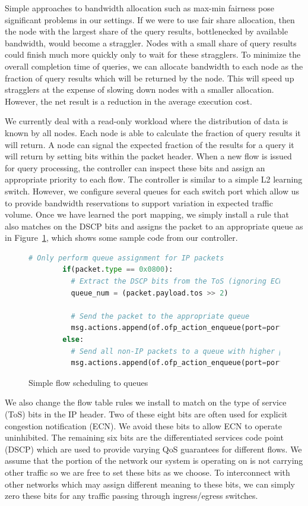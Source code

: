 \documentclass{acm_proc_article-sp}
\begin{document}
Simple approaches to bandwidth allocation such as max-min fairness pose significant problems in our settings.
If we were to use fair share allocation, then the node with the largest share of the query results, bottlenecked by available bandwidth, would become a straggler.
Nodes with a small share of query results could finish much more quickly only to wait for these stragglers.
To minimize the overall completion time of queries, we can allocate bandwidth to each node as the fraction of query results which will be returned by the node.
This will speed up stragglers at the expense of slowing down nodes with a smaller allocation.
However, the net result is a reduction in the average execution cost.

We currently deal with a read-only workload where the distribution of data is known by all nodes.
Each node is able to calculate the fraction of query results it will return.
A node can signal the expected fraction of the results for a query it will return by setting bits within the packet header.
When a new flow is issued for query processing, the controller can inspect these bits and assign an appropriate priority to each flow.
The controller is similar to a simple L2 learning switch.
However, we configure several queues for each switch port which allow us to provide bandwidth reservations to support variation in expected traffic volume.
Once we have learned the port mapping, we simply install a rule that also matches on the DSCP bits and assigns the packet to an appropriate queue as in Figure~\ref{fig:scheduling}, which shows some sample code from our controller.

\begin{figure}
    \begin{lstlisting}[language=Python]
        # Only perform queue assignment for IP packets
        if(packet.type == 0x0800):
          # Extract the DSCP bits from the ToS (ignoring ECN)
          queue_num = (packet.payload.tos >> 2)

          # Send the packet to the appropriate queue
          msg.actions.append(of.ofp_action_enqueue(port=port, queue_id=queue_num))
        else:
          # Send all non-IP packets to a queue with higher priority
          msg.actions.append(of.ofp_action_enqueue(port=port, queue_id=0))
    \end{lstlisting}
    \caption{Simple flow scheduling to queues}\label{fig:scheduling}
\end{figure}

We also change the flow table rules we install to match on the type of service (ToS) bits in the IP header.
Two of these eight bits are often used for explicit congestion notification (ECN).
We avoid these bits to allow ECN to operate uninhibited.
The remaining six bits are the differentiated services code point (DSCP) which are used to provide varying QoS guarantees for different flows.
We assume that the portion of the network our system is operating on is not carrying other traffic so we are free to set these bits as we choose.
To interconnect with other networks which may assign different meaning to these bits, we can simply zero these bits for any traffic passing through ingress/egress switches.
\end{document}
